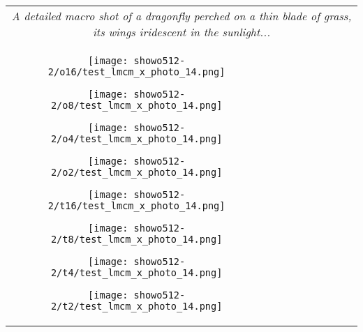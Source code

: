 \begin{figure*}[htbp]
\begin{tabular}{cccccccc}
        \multicolumn{8}{c}{\small \textit{A detailed macro shot of a dragonfly perched on a thin blade of grass, its wings iridescent in the sunlight...}} \\
        

        \vspace{0.1cm}

        


        \begin{minipage}{0.12\linewidth} 
            \centering
            \texttt{[image: showo512-2/o16/test\_lmcm\_x\_photo\_14.png]}
        \end{minipage} 
        \hspace{-0.15cm} %
        \begin{minipage}{0.12\linewidth} 
            \centering
            \texttt{[image: showo512-2/o8/test\_lmcm\_x\_photo\_14.png]}
        \end{minipage} 
        \hspace{-0.15cm}
        \begin{minipage}{0.12\linewidth} 
            \centering
            \texttt{[image: showo512-2/o4/test\_lmcm\_x\_photo\_14.png]}
        \end{minipage} 
        \hspace{-0.15cm}
        \begin{minipage}{0.12\linewidth} 
            \centering
            \texttt{[image: showo512-2/o2/test\_lmcm\_x\_photo\_14.png]}
        \end{minipage} 
        \hspace{0cm}
        \begin{minipage}{0.12\linewidth} 
            \centering
            \texttt{[image: showo512-2/t16/test\_lmcm\_x\_photo\_14.png]}
        \end{minipage} 
        \hspace{-0.15cm}
        \begin{minipage}{0.12\linewidth} 
            \centering
            \texttt{[image: showo512-2/t8/test\_lmcm\_x\_photo\_14.png]}
        \end{minipage} 
        \hspace{-0.15cm}
        \begin{minipage}{0.12\linewidth} 
            \centering
            \texttt{[image: showo512-2/t4/test\_lmcm\_x\_photo\_14.png]}
        \end{minipage} 
        \hspace{-0.15cm}
        \begin{minipage}{0.12\linewidth} 
            \centering
            \texttt{[image: showo512-2/t2/test\_lmcm\_x\_photo\_14.png]}
        \end{minipage} \\


\end{tabular}
\end{figure*}
